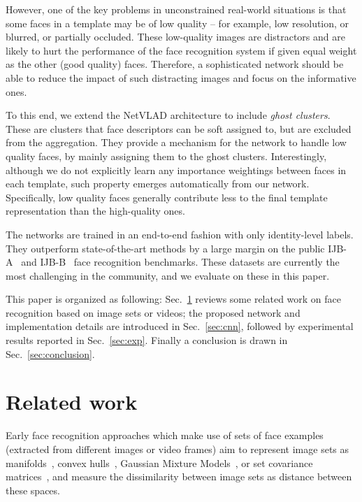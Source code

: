 \documentclass[runningheads]{llncs}
\begin{document}
However, one of the key problems  in unconstrained real-world 
situations is that some faces in a template may be of low quality -- for example,
low resolution, or blurred, or partially occluded.
These low-quality images are distractors 
and are likely to hurt the performance of the 
face recognition system if given equal weight as the other (good quality) faces. Therefore, a sophisticated 
network should be able to reduce the impact 
of such distracting images and focus on the informative 
ones. 

To this end, we extend the NetVLAD architecture to include 
{\em  ghost clusters}. These are clusters that face descriptors can be soft assigned to, but are excluded from 
the aggregation. They provide a mechanism for the network to handle low quality faces, by mainly assigning
them to the ghost clusters.
Interestingly, although we do not explicitly learn 
any importance weightings between faces in each template, 
such property emerges automatically from our network. 
Specifically,
low quality  faces generally contribute less to the 
final template representation than the high-quality ones.

The networks are trained in an 
end-to-end fashion with only identity-level labels.
They outperform 
state-of-the-art methods by a large margin
on the public IJB-A~\cite{Klare15} 
and IJB-B~\cite{Whitelam17} face recognition benchmarks.
These datasets are currently the 
most challenging  in the community, and
we evaluate on these  in this paper.

This paper is organized as following: Sec.~\ref{sec:review}
reviews some related work on face recognition based on 
image sets or videos; the proposed network  
and implementation details are introduced
in Sec.~\ref{sec:cnn}, followed by
experimental results reported
in Sec.~\ref{sec:exp}. Finally a conclusion is drawn 
in Sec.~\ref{sec:conclusion}.


%

\section{Related work}
\label{sec:review}
Early face recognition approaches which make use of sets of face examples
(extracted from different images or video frames)
aim to represent
image sets as 
manifolds~\cite{Lee03,Arandjelovic06,Kim07,Wang08,Turaga11,Yang13,Huang15},
convex hulls~\cite{Cevikalp10},
Gaussian Mixture Models~\cite{Wang15a},
or set covariance matrices~\cite{Wang17a}, 
and measure the dissimilarity between image sets 
as distance
between these spaces. 
\end{document}
